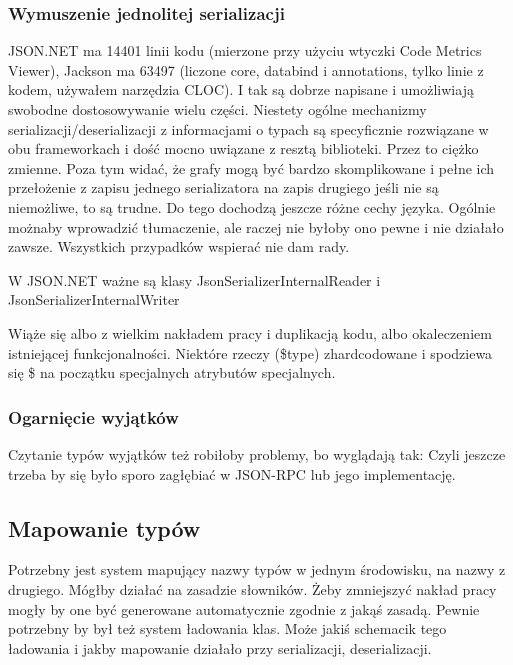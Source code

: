 \subsubsection{Wymuszenie jednolitej serializacji}
JSON.NET ma 14401 linii kodu (mierzone przy użyciu wtyczki Code Metrics Viewer), Jackson ma 63497 (liczone core, databind i annotations, tylko linie z kodem, używałem narzędzia CLOC). I tak są dobrze napisane i umożliwiają swobodne dostosowywanie wielu części. Niestety ogólne mechanizmy serializacji/deserializacji z informacjami o typach są specyficznie rozwiązane w obu frameworkach i dość mocno uwiązane z resztą biblioteki. Przez to ciężko zmienne.
Poza tym widać, że grafy mogą być bardzo skomplikowane i pełne ich przełożenie z zapisu jednego serializatora na zapis drugiego jeśli nie są niemożliwe, to są trudne. Do tego dochodzą jeszcze różne cechy języka.
Ogólnie możnaby wprowadzić tłumaczenie, ale raczej nie byłoby ono pewne i nie działało zawsze.
Wszystkich przypadków wspierać nie dam rady.

W JSON.NET ważne są klasy JsonSerializerInternalReader i JsonSerializerInternalWriter

Wiąże się albo z wielkim nakładem pracy i duplikacją kodu, albo okaleczeniem istniejącej funkcjonalności. Niektóre rzeczy (\$type) zhardcodowane i spodziewa się \$ na początku specjalnych atrybutów specjalnych.

\subsubsection{Ogarnięcie wyjątków}
Czytanie typów wyjątków też robiłoby problemy, bo wyglądają tak:
Czyli jeszcze trzeba by się było sporo zagłębiać w JSON-RPC lub jego implementację.


\subsection{Mapowanie typów}
Potrzebny jest system mapujący nazwy typów w jednym środowisku, na nazwy z drugiego. Mógłby działać na zasadzie słowników. Żeby zmniejszyć nakład pracy mogły by one być generowane automatycznie zgodnie z jakąś zasadą.
Pewnie potrzebny by był też system ładowania klas.
Może jakiś schemacik tego ładowania i jakby mapowanie działało przy serializacji, deserializacji.


